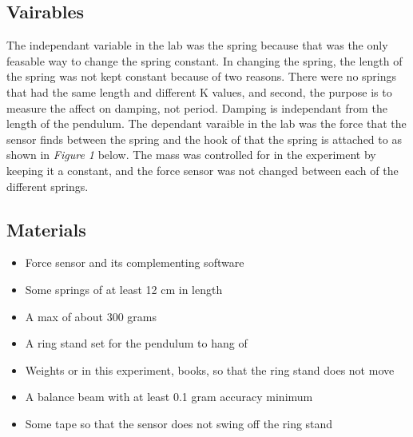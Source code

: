 \documentclass{report}
\begin{document}
\subsection*{Vairables}
\indent The independant variable in the lab was the spring because that was the only feasable way to change the spring constant. In changing the spring, the length of the spring was not kept constant because of two reasons. There were no springs that had the same length and different K values, and second, the purpose is to measure the affect on damping, not period. Damping is independant from the length of the pendulum. The dependant varaible in the lab was the force that the sensor finds between the spring and the hook of that the spring is attached to as shown in \textit{Figure 1} below. The mass was controlled for in the experiment by keeping it a constant, and the force sensor was not changed between each of the different springs.

\subsection*{Materials}
\begin{itemize}
\item Force sensor and its complementing software
\item Some springs of at least 12 cm in length
\item A max of about 300 grams
\item A ring stand set for the pendulum to hang of
\item Weights or in this experiment, books, so that the ring stand does not move
\item A balance beam with at least 0.1 gram accuracy minimum
\item Some tape so that the sensor does not swing off the ring stand
\end{itemize}
\end{document}
